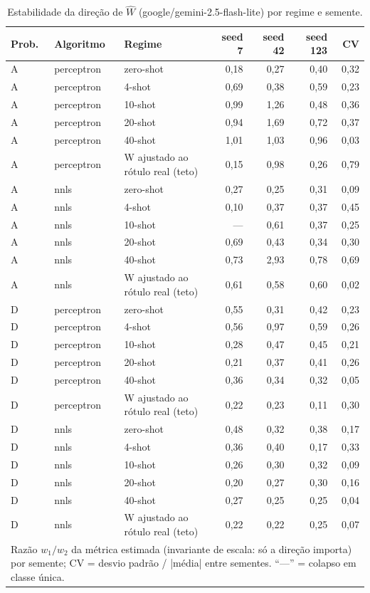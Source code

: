 \begin{table}[htbp]
\centering
\small
\caption{Estabilidade da direção de $\hat{W}$ (google/gemini-2.5-flash-lite) por regime e semente.}
\label{tab:T4_W_flashlite}
\begin{tabular}{lllrrrr}
\toprule
Prob. & Algoritmo & Regime & seed 7 & seed 42 & seed 123 & CV \\
\midrule
A & perceptron & zero-shot & 0,18 & 0,27 & 0,40 & 0,32 \\
A & perceptron & 4-shot & 0,69 & 0,38 & 0,59 & 0,23 \\
A & perceptron & 10-shot & 0,99 & 1,26 & 0,48 & 0,36 \\
A & perceptron & 20-shot & 0,94 & 1,69 & 0,72 & 0,37 \\
A & perceptron & 40-shot & 1,01 & 1,03 & 0,96 & 0,03 \\
A & perceptron & W ajustado ao rótulo real (teto) & 0,15 & 0,98 & 0,26 & 0,79 \\
\midrule
A & nnls & zero-shot & 0,27 & 0,25 & 0,31 & 0,09 \\
A & nnls & 4-shot & 0,10 & 0,37 & 0,37 & 0,45 \\
A & nnls & 10-shot & — & 0,61 & 0,37 & 0,25 \\
A & nnls & 20-shot & 0,69 & 0,43 & 0,34 & 0,30 \\
A & nnls & 40-shot & 0,73 & 2,93 & 0,78 & 0,69 \\
A & nnls & W ajustado ao rótulo real (teto) & 0,61 & 0,58 & 0,60 & 0,02 \\
\midrule
D & perceptron & zero-shot & 0,55 & 0,31 & 0,42 & 0,23 \\
D & perceptron & 4-shot & 0,56 & 0,97 & 0,59 & 0,26 \\
D & perceptron & 10-shot & 0,28 & 0,47 & 0,45 & 0,21 \\
D & perceptron & 20-shot & 0,21 & 0,37 & 0,41 & 0,26 \\
D & perceptron & 40-shot & 0,36 & 0,34 & 0,32 & 0,05 \\
D & perceptron & W ajustado ao rótulo real (teto) & 0,22 & 0,23 & 0,11 & 0,30 \\
\midrule
D & nnls & zero-shot & 0,48 & 0,32 & 0,38 & 0,17 \\
D & nnls & 4-shot & 0,36 & 0,40 & 0,17 & 0,33 \\
D & nnls & 10-shot & 0,26 & 0,30 & 0,32 & 0,09 \\
D & nnls & 20-shot & 0,20 & 0,27 & 0,30 & 0,16 \\
D & nnls & 40-shot & 0,27 & 0,25 & 0,25 & 0,04 \\
D & nnls & W ajustado ao rótulo real (teto) & 0,22 & 0,22 & 0,25 & 0,07 \\
\bottomrule
\multicolumn{7}{p{0.95\linewidth}}{\footnotesize Razão $w_1/w_2$ da métrica estimada (invariante de escala: só a direção importa) por semente; CV = desvio padrão / |média| entre sementes. ``—'' = colapso em classe única.} \\
\end{tabular}
\end{table}
